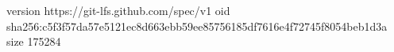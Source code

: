 version https://git-lfs.github.com/spec/v1
oid sha256:c5f3f57da57e5121ec8d663ebb59ee85756185df7616e4f72745f8054beb1d3a
size 175284
